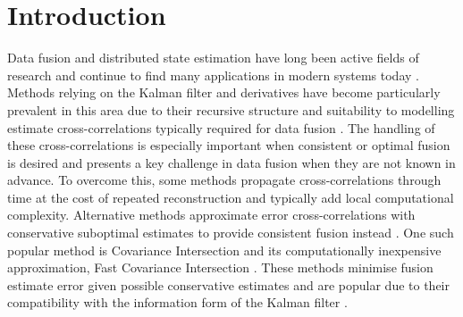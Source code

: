 \documentclass[letterpaper, 10 pt, conference]{ieeeconf}
\begin{document}
\section{Introduction}\label{sec:introduction}
Data fusion and distributed state estimation have long been active fields of research and continue to find many applications in modern systems today \cite{andersonOptimalFiltering1979,simonOptimalStateEstimation2006}. Methods relying on the Kalman filter and derivatives \cite{haugBayesianEstimationTracking2012} have become particularly prevalent in this area due to their recursive structure and suitability to modelling estimate cross-correlations typically required for data fusion \cite{mutambaraDecentralizedEstimationControl1998,ligginsDistributedDataFusion2012}. The handling of these cross-correlations is especially important when consistent or optimal fusion is desired \cite{bar-shalomTracktotrackCorrelationProblem1981,sunMultisensorOptimalInformation2004} and presents a key challenge in data fusion when they are not known in advance. To overcome this, some methods propagate cross-correlations through time at the cost of repeated reconstruction \cite{steinbringOptimalSamplebasedFusion2016} and typically add local computational complexity. Alternative methods approximate error cross-correlations with conservative suboptimal estimates to provide consistent fusion instead \cite{julierNondivergentEstimationAlgorithm1997,noackDecentralizedDataFusion2017,niehsenInformationFusionBased2002}. One such popular method is Covariance Intersection \cite{julierNondivergentEstimationAlgorithm1997} and its computationally inexpensive approximation, Fast Covariance Intersection \cite{niehsenInformationFusionBased2002}. These methods minimise fusion estimate error given possible conservative estimates and are popular due to their compatibility with the information form of the Kalman filter \cite{mutambaraDecentralizedEstimationControl1998,pfaffInformationFormDistributed2017}.
\end{document}
